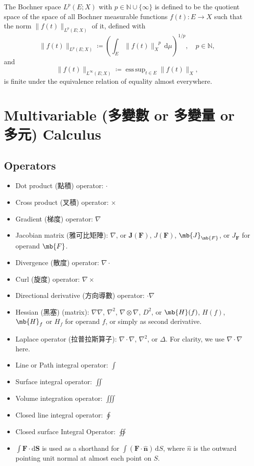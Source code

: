 \documentclass[a4paper,12pt]{report}
\begin{document}
\begin{itemize}
\begin{itemize}
The Bochner space $L^p(E;X)$ with $p\in\mathbb{N}\cup\{\infty\}$ is defined to be the quotient space of the space of all Bochner measurable functions $f(t)\colon E\to X$ such that the norm $\|f(t)\|_{L^p(E;X)}$ of it, defined with
\[\|f(t)\|_{L^p(E;X)}\coloneq\left(\int_E\|f(t)\|_X^{\phantom{X}p}\,\mathrm{d}\mu\right)^{1/p},\quad p\in\mathbb{N},\]
and
\[\|f(t)\|_{L^{\infty }(E;X)}\coloneq\operatorname{ess\,sup}_{t\in E}\|f(t)\|_{X},\]
is finite under the equivalence relation of equality almost everywhere.



\section{Multivariable (多變數 or 多變量 or 多元) Calculus}
\subsection{Operators}
\begin{itemize}
\item Dot product (點積) operator: $\cdot$
\item Cross product (叉積) operator: $\times$
\item Gradient (梯度) operator: $\nabla$
\item Jacobian matrix (雅可比矩陣): $\nabla$, or $\mathbf{J}(\mathbf{F})$, $J(\mathbf{F})$, $\mb{J}_{\mb{F}}$, or $J_{\mathbf{F}}$ for operand $\mb{F}$.
\item Divergence (散度) operator: $\nabla \cdot$
\item Curl (旋度) operator: $\nabla \times$
\item Directional derivative (方向導數) operator: $\cdot\nabla$
\item Hessian (黑塞) (matrix): $\nabla\nabla$, $\nabla^2$, $\nabla\otimes\nabla$, $D^2$, or $\mb{H}(f)$, $H(f)$, $\mb{H}_f$ or $H_f$ for operand $f$, or simply as second derivative.
\item Laplace operator (拉普拉斯算子): $\nabla\cdot\nabla$, $\nabla^2$, or $\Delta$. For clarity, we use $\nabla\cdot\nabla$ here.
\item Line or Path integral operator: $\int$
\item Surface integral operator: $\iint$
\item Volume integration operator: $\iiint$
\item Closed line integral operator: $\oint$
\item Closed surface Integral Operator: $\oiint$
\item $\int\mathbf{F}\cdot\mathrm{d}\mathbf{S}$ is used as a shorthand for $\int(\mathbf{F}\cdot\mathbf{\hat{n}})\,\mathrm{d}S$, where $\hat{n}$ is the outward pointing unit normal at almost each point on $S$.
\end{itemize}

\end{itemize}
\end{itemize}
\end{document}
